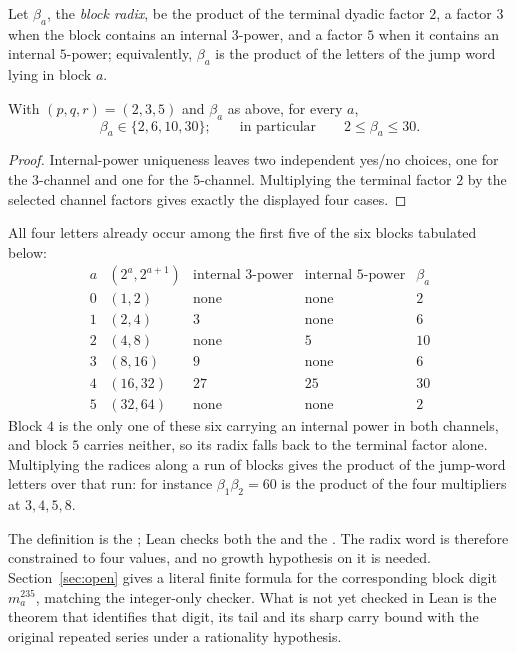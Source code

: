 \documentclass[11pt]{article}
\begin{document}
Let $\beta_a$, the \emph{block radix}, be the product of the terminal dyadic
factor $2$, a factor $3$
when the block contains an internal $3$-power, and a factor $5$ when it
contains an internal $5$-power; equivalently, $\beta_a$ is the product of the
letters of the jump word lying in block $a$.

\begin{theorem}\label{res:dyadic-alphabet}
With $(p,q,r)=(2,3,5)$ and $\beta_a$ as above, for every $a$,
\[
  \beta_a\in\{2,6,10,30\};
  \qquad\text{in particular}\qquad 2\le\beta_a\le30.
\]
\end{theorem}

\begin{proof}
Internal-power uniqueness leaves two independent yes/no choices, one for the
$3$-channel and one for the $5$-channel.  Multiplying the terminal factor $2$
by the selected channel factors gives exactly the displayed four cases.
\end{proof}

All four letters already occur among the first five of the six blocks
tabulated below:
\[
\begin{array}{c|c|c|c|c}
a & (2^{a},2^{a+1}) & \text{internal }3\text{-power} & \text{internal }5\text{-power} & \beta_a\\ \hline
0 & (1,2)   & \text{none} & \text{none} & 2\\
1 & (2,4)   & 3           & \text{none} & 6\\
2 & (4,8)   & \text{none} & 5           & 10\\
3 & (8,16)  & 9           & \text{none} & 6\\
4 & (16,32) & 27          & 25          & 30\\
5 & (32,64) & \text{none} & \text{none} & 2
\end{array}
\]
Block $4$ is the only one of these six carrying an internal power in both
channels, and block $5$ carries neither, so its radix falls back to the
terminal factor alone.  Multiplying the radices along a run of blocks gives the
product of the jump-word letters over that run: for instance
$\beta_1\beta_2=60$ is the product of the four multipliers at
$3,4,5,8$.

The definition is the
; Lean checks both the
 and the
.  The radix word is therefore constrained to four values, and no
growth hypothesis on it is needed.  Section~\ref{sec:open} gives a literal
finite formula for the corresponding block digit $m_a^{235}$, matching the
integer-only checker.  What is not yet checked in Lean is the theorem that
identifies that digit, its tail and its sharp carry bound with the original
repeated series under a rationality hypothesis.
\end{document}
